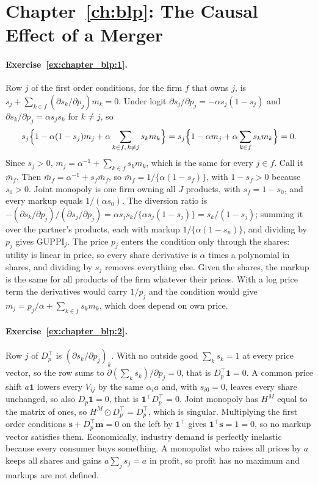 \section*{Chapter~\ref{ch:blp}: The Causal Effect of a Merger}

\paragraph{Exercise~\ref{ex:chapter_blp:1}.} Row $j$ of the first order conditions, for the firm $f$ that owns $j$, is $s_j+\sum_{k\in f}(\partial s_k/\partial p_j)m_k=0$. Under logit $\partial s_j/\partial p_j=-\alpha s_j(1-s_j)$ and $\partial s_k/\partial p_j=\alpha s_js_k$ for $k\neq j$, so
\[
s_j\Bigl\{1-\alpha(1-s_j)m_j+\alpha\sum_{k\in f,\,k\neq j}s_km_k\Bigr\}=s_j\Bigl\{1-\alpha m_j+\alpha\sum_{k\in f}s_km_k\Bigr\}=0 .
\]
Since $s_j>0$, $m_j=\alpha^{-1}+\sum_{k\in f}s_km_k$, which is the same for every $j\in f$. Call it $\bar m_f$. Then $\bar m_f=\alpha^{-1}+s_f\bar m_f$, so $\bar m_f=1/\{\alpha(1-s_f)\}$, with $1-s_f>0$ because $s_0>0$. Joint monopoly is one firm owning all $J$ products, with $s_f=1-s_0$, and every markup equals $1/(\alpha s_0)$. The diversion ratio is $-(\partial s_k/\partial p_j)/(\partial s_j/\partial p_j)=\alpha s_js_k/\{\alpha s_j(1-s_j)\}=s_k/(1-s_j)$; summing it over the partner's products, each with markup $1/\{\alpha(1-s_n)\}$, and dividing by $p_j$ gives $\mathrm{GUPPI}_j$. The price $p_j$ enters the condition only through the shares: utility is linear in price, so every share derivative is $\alpha$ times a polynomial in shares, and dividing by $s_j$ removes everything else. Given the shares, the markup is the same for all products of the firm whatever their prices. With a log price term the derivatives would carry $1/p_j$ and the condition would give $m_j=p_j/\alpha+\sum_{k\in f}s_km_k$, which does depend on own price.

\paragraph{Exercise~\ref{ex:chapter_blp:2}.} Row $j$ of $D_p^\top$ is $(\partial s_k/\partial p_j)_k$. With no outside good $\sum_ks_k=1$ at every price vector, so the row sums to $\partial(\sum_ks_k)/\partial p_j=0$, that is $D_p^\top\bm 1=0$. A common price shift $a\bm 1$ lowers every $V_{ij}$ by the same $\alpha_ia$ and, with $s_{i0}=0$, leaves every share unchanged, so also $D_p\bm 1=0$, that is $\bm 1^\top D_p^\top=0$. Joint monopoly has $H^M$ equal to the matrix of ones, so $H^M\odot D_p^\top=D_p^\top$, which is singular. Multiplying the first order conditions $\bm s+D_p^\top\bm m=0$ on the left by $\bm 1^\top$ gives $\bm 1^\top\bm s=1=0$, so no markup vector satisfies them. Economically, industry demand is perfectly inelastic because every consumer buys something. A monopolist who raises all prices by $a$ keeps all shares and gains $a\sum_js_j=a$ in profit, so profit has no maximum and markups are not defined.

